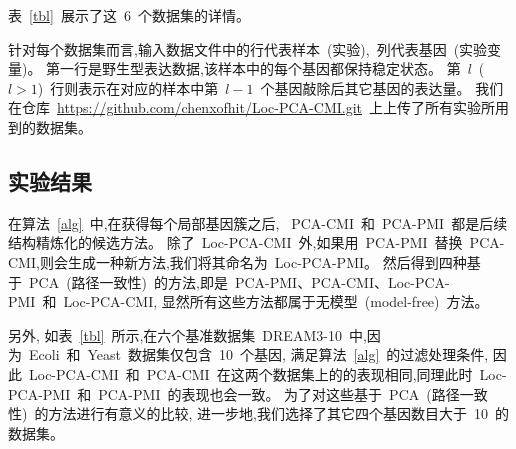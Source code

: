 表~\ref{tbl}~展示了这~6~个数据集的详情。
\begin{table} [!htbp]
\caption{实验所使用的数据集描述} 
\label{tbl} 
\begin{center}
\end{center}
\end{table} 

针对每个数据集而言,输入数据文件中的行代表样本~(实验),~列代表基因~(实验变量)。
第一行是野生型表达数据,该样本中的每个基因都保持稳定状态。
第~$l$~($l>1$)~行则表示在对应的样本中第~$l-1$~个基因敲除后其它基因的表达量。
我们在仓库~\url{https://github.com/chenxofhit/Loc-PCA-CMI.git}~上上传了所有实验所用到的数据集。

\subsection{实验结果}

在算法~\ref{alg}~中,在获得每个局部基因簇之后,
~PCA-CMI~和~PCA-PMI~都是后续结构精炼化的候选方法。
除了~Loc-PCA-CMI~外,如果用~PCA-PMI~替换~PCA-CMI,则会生成一种新方法,我们将其命名为~Loc-PCA-PMI。
然后得到四种基于~PCA~(路径一致性)~的方法,即是~PCA-PMI、PCA-CMI、Loc-PCA-PMI~和~Loc-PCA-CMI,
显然所有这些方法都属于无模型~(model-free)~方法。

另外, 如表~\ref{tbl}~所示,在六个基准数据集~DREAM3-10~中,因为~Ecoli~和~Yeast~数据集仅包含~10~个基因,
满足算法~\ref{alg}~的过滤处理条件,
因此~Loc-PCA-CMI~和~PCA-CMI~在这两个数据集上的的表现相同,同理此时~Loc-PCA-PMI~和~PCA-PMI~的表现也会一致。
为了对这些基于~PCA~(路径一致性)~的方法进行有意义的比较,
进一步地,我们选择了其它四个基因数目大于~10~的数据集。

